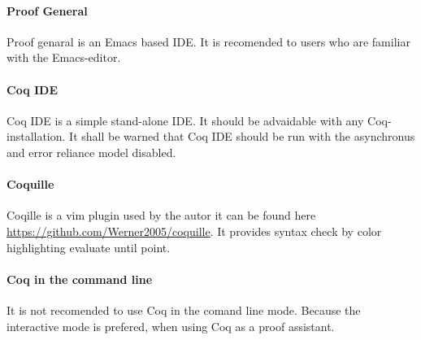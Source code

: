 \paragraph{Proof General}
Proof genaral is an \gls{Emacs} based IDE. 
It is recomended to users who are familiar with the Emacs-editor.

\paragraph{Coq IDE}
Coq IDE is a simple stand-alone IDE. 
It should be advaidable with any Coq-installation. 
It shall be warned that Coq IDE should be run with the asynchronus and error reliance model disabled. 



\paragraph{Coquille}
Coqille is a vim plugin used by the autor it can be found here \url{https://github.com/Werner2005/coquille}.
It provides syntax check by color highlighting evaluate until point.

\paragraph{Coq in the command line}
It is not recomended to use Coq in the comand line mode. 
Because the interactive mode is prefered, when using Coq as a proof assistant. 





